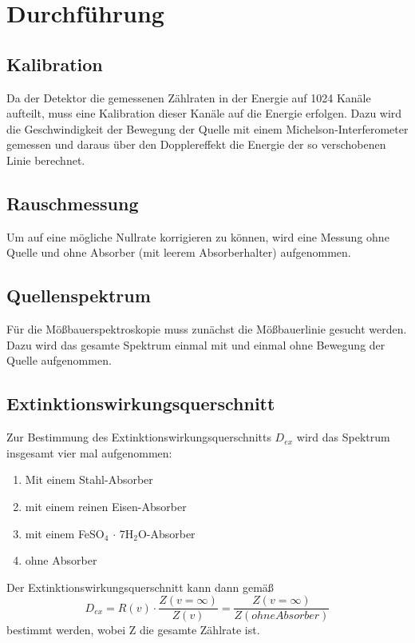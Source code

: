 \documentclass[12pt,a4paper]{article}
\begin{document}
\section{Durchführung}
\subsection{Kalibration}
Da der Detektor die gemessenen Zählraten in der Energie auf 1024 Kanäle aufteilt, muss eine Kalibration dieser Kanäle auf die Energie erfolgen. Dazu wird die Geschwindigkeit der Bewegung der Quelle mit einem Michelson-Interferometer gemessen und daraus über den Dopplereffekt die Energie der so verschobenen Linie berechnet.

\subsection{Rauschmessung}
Um auf eine mögliche Nullrate korrigieren zu können, wird eine Messung ohne Quelle und ohne Absorber (mit leerem Absorberhalter) aufgenommen.

\subsection{Quellenspektrum}
Für die Mößbauerspektroskopie muss zunächst die Mößbauerlinie gesucht werden. Dazu wird das gesamte Spektrum einmal mit und einmal ohne Bewegung der Quelle aufgenommen.

\subsection{Extinktionswirkungsquerschnitt}
Zur Bestimmung des Extinktionswirkungsquerschnitts $D_{ex}$ wird das Spektrum insgesamt vier mal aufgenommen:
\begin{enumerate}
\item Mit einem Stahl-Absorber
\item mit einem reinen Eisen-Absorber
\item mit einem FeSO$_4$ $\cdot$ 7H$_2$O-Absorber
\item ohne Absorber 
\end{enumerate} 
Der Extinktionswirkungsquerschnitt kann dann gemäß
\begin{equation}
D_{ex} = R(v) \cdot \dfrac{Z(v = \infty)}{Z(v)} = \dfrac{Z(v = \infty)}{Z(ohne Absorber)}
\end{equation}
bestimmt werden, wobei Z die gesamte Zählrate ist.
\end{document}

